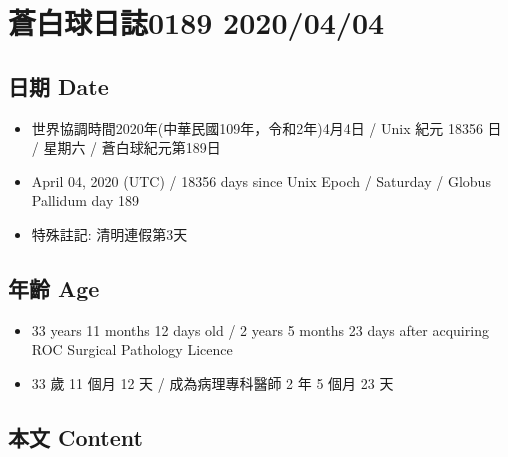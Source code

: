 \documentclass[a5paper, 11pt
]{book}
\providecommand{\tightlist}{%
  \setlength{\itemsep}{0pt}\setlength{\parskip}{0pt}}
\begin{document}
\hypertarget{ux84bcux767dux7403ux65e5ux8a8c0189-20200404}{%
\section{蒼白球日誌0189
2020/04/04}\label{ux84bcux767dux7403ux65e5ux8a8c0189-20200404}}

\hypertarget{ux65e5ux671f-date-34}{%
\subsection{日期 Date}\label{ux65e5ux671f-date-34}}

\begin{itemize}
\tightlist
\item
  世界協調時間2020年(中華民國109年，令和2年)4月4日 / Unix 紀元 18356 日
  / 星期六 / 蒼白球紀元第189日
\item
  April 04, 2020 (UTC) / 18356 days since Unix Epoch / Saturday / Globus
  Pallidum day 189
\item
  特殊註記: 清明連假第3天
\end{itemize}

\hypertarget{ux5e74ux9f61-age-34}{%
\subsection{年齡 Age}\label{ux5e74ux9f61-age-34}}

\begin{itemize}
\tightlist
\item
  33 years 11 months 12 days old / 2 years 5 months 23 days after
  acquiring ROC Surgical Pathology Licence
\item
  33 歲 11 個月 12 天 / 成為病理專科醫師 2 年 5 個月 23 天
\end{itemize}

\hypertarget{ux672cux6587-content-34}{%
\subsection{本文 Content}\label{ux672cux6587-content-34}}
\end{document}
